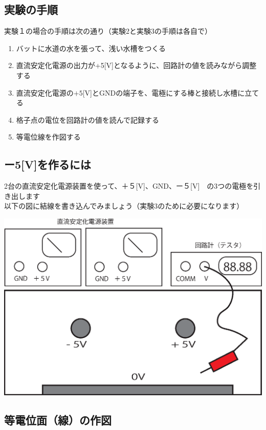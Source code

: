 \documentclass[uplatex,a4paper,11pt,oneside,openany]{jsbook}
\begin{document}
\subsection{実験の手順}

実験１の場合の手順は次の通り（実験2と実験3の手順は各自で）

\begin{enumerate}
  \item バットに水道の水を張って、浅い水槽をつくる
  \item 直流安定化電源の出力が+5[V]となるように、回路計の値を読みながら調整する
  \item 直流安定化電源の$+5$[V]とGNDの端子を、電極にする棒と接続し水槽に立てる
  \item 格子点の電位を回路計の値を読んで記録する
  \item 等電位線を作図する
\end{enumerate}

\subsection{ー5[V]を作るには}

2台の直流安定化電源装置を使って、＋５[V]、GND、ー５[V]　の3つの電極を引き出します\\
以下の図に結線を書き込んでみましょう（実験3のために必要になります）\\

\begin{center}
\includegraphics[scale=0.5]{./figure/powersupply.eps}
\end{center}

\newpage

\subsection{等電位面（線）の作図}
\end{document}
